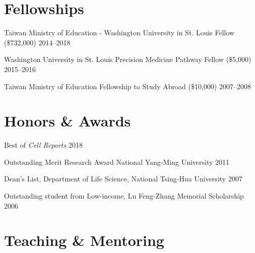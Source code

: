 \documentclass[letterpaper,11pt]{cv}
\begin{document}
\section{Fellowships}

\begin{entrylist}
\item Taiwan Ministry of Education - Washington University in St. Louis Fellow (\$732,000) \hfill 2014--2018
\item Washington University in St. Louis Precision Medicine Pathway Fellow (\$5,000)  \hfill 2015--2016
\item Taiwan Ministry of Education Fellowship to Study Abroad (\$10,000) \hfill 2007--2008
\end{entrylist}

\section{Honors \& Awards}

\begin{detaillist}
\item Best of \textit{Cell Reports}
    \hfill 2018

\item Outstanding Merit Research Award National Yang-Ming University
    \hfill 2011

\item Dean's List, Department of Life Science, National Tsing-Hua University
    \hfill 2007

\item Outstanding student from Low-income, Lu Feng-Zhang Memorial Scholarship
    \hfill
    2006

\end{detaillist}


\section{Teaching \& Mentoring}
\end{document}
